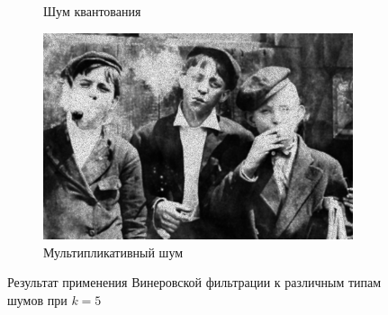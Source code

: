 \begin{figure}[ht!]
\begin{subfigure}[b]{0.5\linewidth}
      \caption{Шум квантования} 
      \label{weiner_5:e}
    \end{subfigure}%
    \begin{subfigure}[b]{0.5\linewidth}
        \centering
        \includegraphics[width=0.95\linewidth]{../Wiener_Filter/Wiener_Speckle_noise_(k=5).jpg} 
        \caption{Мультипликативный шум} 
        \label{weiner_5:f} 
    \end{subfigure} 
    \caption{Результат применения Винеровской фильтрации к различным типам шумов при $k = 5$}
    \label{img:weiner_5} 
\end{figure}

